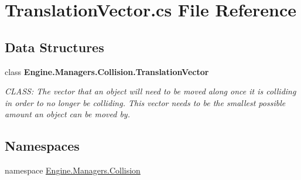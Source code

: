 \hypertarget{a00167}{}\section{Translation\+Vector.\+cs File Reference}
\label{a00167}
\subsection*{Data Structures}
\begin{DoxyCompactItemize}
\item 
class {\bfseries Engine.\+Managers.\+Collision.\+Translation\+Vector}
\begin{DoxyCompactList}\small\item\em C\+L\+A\+SS\+: The vector that an object will need to be moved along once it is colliding in order to no longer be colliding. This vector needs to be the smallest possible amount an object can be moved by. \end{DoxyCompactList}\end{DoxyCompactItemize}
\subsection*{Namespaces}
\begin{DoxyCompactItemize}
\item 
namespace \hyperlink{a00268}{Engine.\+Managers.\+Collision}
\end{DoxyCompactItemize}
